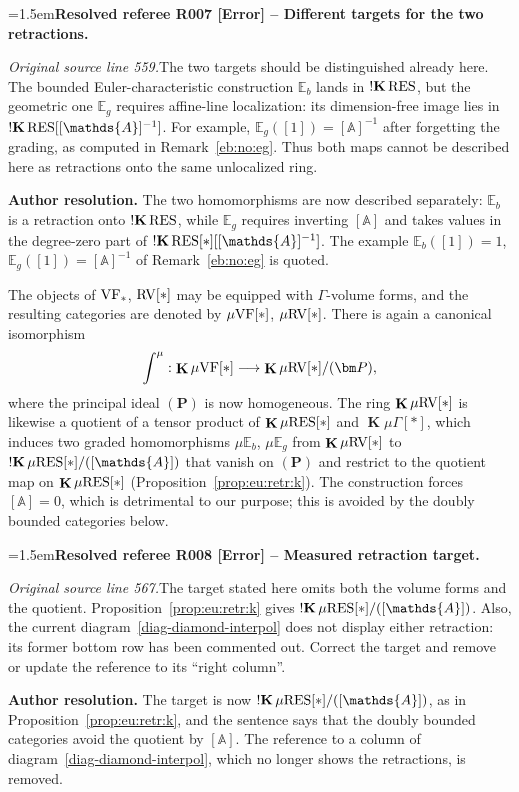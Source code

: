 \documentclass[12pt]{amsart}
\newcommand{\ResolvedRefereeRemark}[5]{%
  \par\medskip\begingroup\normalfont\small\color{gray}%
  \emergencystretch=1.5em\noindent\textbf{Resolved referee R#1 [#2] -- #3.}\par\nobreak\noindent #4\par
  \medskip\color{ResolutionGreen}\noindent\textbf{Author resolution.} #5\par
  \endgroup\medskip
}
\theoremstyle{plain}
\theoremstyle{definition}
\theoremstyle{remark}
\numberwithin{equation}{section}
\theoremstyle{plain}
\newcommand{\VF}{\textup{VF}}
\newcommand{\RV}{\textup{RV}}
\newcommand{\A}{\mathds{A}}
\newcommand{\0}{\emptyset}
\newcommand{\bb}[1]{\mathbb{#1}}
\newcommand{\fun}{\longrightarrow}
\newcommand{\mgVF}{{\mu} {\VF}}
\newcommand{\mgRV}{{\mu}{\RV}}
\newcommand{\mG}{{\mu}{\Gamma}}
\newcommand{\RES}{\textup{RES}}
\newcommand{\mgRES}{{\mu}{\RES}}
\newcommand{\mgE}{{\mu}{\bb E}}
\DeclareMathOperator{\ggk}{\mathbf{K}}
\DeclareMathOperator{\sggk}{!\mathbf{K}}
\begin{document}
\ResolvedRefereeRemark{007}{Error}{Different targets for the two retractions}{%
\textit{Original source line 559.}\quad The two targets should be distinguished already here. The bounded Euler-characteristic construction $\bb E_b$ lands in $\sggk\RES$, but the geometric one $\bb E_g$ requires affine-line localization: its dimension-free image lies in $\sggk\RES[[\A]^{-1}]$. For example, $\bb E_g([1])=[\A]^{-1}$ after forgetting the grading, as computed in Remark~\ref{eb:no:eg}. Thus both maps cannot be described here as retractions onto the same unlocalized ring.
}{The two homomorphisms are now described separately: $\bb E_b$ is a retraction onto $\sggk \RES$, while $\bb E_g$ requires inverting $[\A]$ and takes values in the degree-zero part of $\sggk\RES[*][[\A]^{-1}]$. The example $\bb E_b([1]) = 1$, $\bb E_g([1]) = [\A]^{-1}$ of Remark~\ref{eb:no:eg} is quoted.}


The objects of $\VF_*$, $\RV[*]$ may be equipped with $\Gamma$-volume forms, and the resulting categories are denoted by $\mgVF[*]$, $\mgRV[*]$. There is again a  canonical isomorphism
\[
\int^\mu : \ggk\mgVF[*] \fun \ggk\mgRV[*]/(\bm P),
\]
where the principal ideal $(\bm P)$ is now homogeneous. The ring $\ggk\mgRV[*]$ is likewise a quotient of a tensor product of  $\ggk \mgRES[*]$ and $\ggk \mG[*]$, which induces two graded homomorphisms $\mgE_ {b}$, $\mgE_{g}$ from $\ggk\mgRV[*]$ to $\sggk \mgRES[*]/([\A])$ that vanish on $(\bm P)$ and restrict to the quotient map on $\ggk \mgRES[*]$ (Proposition~\ref{prop:eu:retr:k}). The construction forces $[\A] = 0$, which is detrimental to our purpose; this is avoided by the doubly bounded categories below.

\ResolvedRefereeRemark{008}{Error}{Measured retraction target}{%
\textit{Original source line 567.}\quad The target stated here omits both the volume forms and the quotient. Proposition~\ref{prop:eu:retr:k} gives $\sggk\mgRES[*]/([\A])$. Also, the current diagram~\eqref{diag-diamond-interpol} does not display either retraction: its former bottom row has been commented out. Correct the target and remove or update the reference to its ``right column''. 
}{The target is now $\sggk\mgRES[*]/([\A])$, as in Proposition~\ref{prop:eu:retr:k}, and the sentence says that the doubly bounded categories avoid the quotient by $[\A]$. The reference to a column of diagram~\eqref{diag-diamond-interpol}, which no longer shows the retractions, is removed.}
\end{document}
